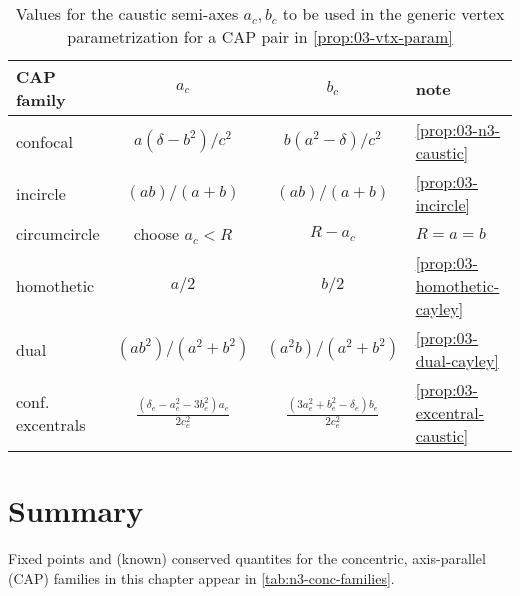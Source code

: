 \begin{table}
\centering
\begin{tabular}{|l|c|c|l|}
\hline
CAP family        & $a_c$ & $b_c$ & note \\
\hline
confocal     & ${a\left(\delta-{b}^{2}\right)}/{c^2}$ & ${b\left({a}^{2}-\delta\right)}/{c^2}$ & \cref{prop:03-n3-caustic}  \\
\hline
incircle  & $(a b)/(a+b)$  & $(a b)/(a+b)$  & \cref{prop:03-incircle}  \\
\hline
circumcircle & choose $a_c<R$ & $R-a_c$ & $R=a=b$     \\
\hline
homothetic   &  $a/2$ & $b/2$ &  \cref{prop:03-homothetic-cayley}    \\
\hline
dual & $(a b^2)/(a^2+b^2)$  & $(a^2 b)/(a^2+b^2)$   &  \cref{prop:03-dual-cayley}    \\
\hline
\makecell[lc]{conf.\\excentrals} & $\frac{(\delta_e- a_e^2 - 3b_e^2) a_e}{2 c_e^2}$ & $\frac{(3a_e^2 + b_e^2 - \delta_e)b_e}{2 c_e^2}$   & \cref{prop:03-excentral-caustic}\\
\hline
\end{tabular}
\caption{Values for the caustic semi-axes $a_c,b_c$ to be used in the generic vertex parametrization for a CAP pair in \cref{prop:03-vtx-param}}
\label{tab:03-cap-vtx}
\end{table}

\section{Summary}

Fixed points and (known) conserved quantites for the concentric, axis-parallel (CAP) families in this chapter appear in
\cref{tab:n3-conc-families}. 

